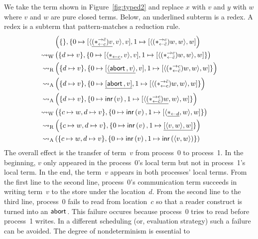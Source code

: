 \begin{example}
 We take the term shown in
 Figure~\ref{fig:typed2} and replace $x$ with $v$ and $y$ with $w$ where
 $v$ and $w$ are pure closed terms.
 Below, an underlined subterm is a redex.  A redex is a subterm that
 pattern-matches a reduction rule.
 \begin{align*}
  &\left(\{\}, \{
  0\mapsto[{\langle{\underline{(\ast^{\rightarrow {\bar{c}}}_{\leftarrow{c}})v},v}\rangle,v}],
  1\mapsto[{\langle{           (\ast^{\rightarrow {c}}_{\leftarrow{\bar{c}}})w ,w}\rangle,w}]
  \right)
  \\   \rightsquigarrow_{\mathrm W} &
  \left( \{d\mapsto v\},
  \{
  0\mapsto [{{\langle{\underline{\ast_{\leftarrow{c}}},  v}\rangle}, v}],
  1\mapsto [{           \langle{(\ast^{\rightarrow {c}}_{\leftarrow{\bar{c}}})w,w}\rangle,w}]
  \}
  \right)
  \\ \rightsquigarrow_{\mathrm R} &
  \left( \{d\mapsto v\},
  \{
  0\mapsto [{\underline{\langle{\mathsf{abort\,},  v}\rangle}, v}],
  1\mapsto [{           \langle{(\ast^{\rightarrow {c}}_{\leftarrow{\bar{c}}})w,w}\rangle,w}]
  \}
  \right)
  \\
  \rightsquigarrow_{\mathrm A} &
  \left(
  \{d\mapsto v\},
  \{
  0\mapsto\underline{[{\mathsf{abort\,},v}]},
  1\mapsto{[{\langle{(\ast^{\rightarrow {\bar{c}}}_{\leftarrow{c}})w,w}\rangle,w}]}
  \}
  \right)
  \\
  \rightsquigarrow_{\mathrm A} &
  \left(\{d\mapsto v\},
  \{
  0\mapsto\mathsf{inr}\left({v}\right),
  1\mapsto[{\langle{\underline{(\ast^{\rightarrow {c}}_{\leftarrow{\bar{c}}})w},w}\rangle,w}]
  \}
  \right)
  \\
  \rightsquigarrow_{\mathrm W} &
  \left(
  \{c\mapsto w, d\mapsto v\}
  ,
  \{
  0\mapsto \mathsf{inr}\left({v}\right),
  1\mapsto [{\langle{\underline{\ast_{\leftarrow{d}}}, w}\rangle, w}]
  \}
  \right)
  \\
  \rightsquigarrow_{\mathrm R} &
  \left(
  \{c\mapsto w, d\mapsto v\}
  ,
  \{
  0\mapsto \mathsf{inr}\left({v}\right),
  1\mapsto \underline{[{\langle{v,w}\rangle,w}]}
  \}
  \right)
  \\
  \rightsquigarrow_{\mathrm A} &
  \left(
  \{c\mapsto w, d\mapsto v\}
  ,
  \{
  0\mapsto \mathsf{inr}\left({v}\right),
  1\mapsto \mathsf{inr}\left({\langle{v,w}\rangle}\right)
  \}
  \right)
 \end{align*}
 The overall effect is the transfer of term~$v$ from process~0 to
 process~1.  In the beginning, $v$ only appeared in the process~0's
 local term but not in process~1's local term.  In the end, the
 term~$v$ appears in both processes' local terms.
 From the first line to the second line,
 process~0's communication term succeeds in writing term~$v$ to the
 store under the location~$d$.
 From the second line to the third line, process~0 fails to read from
 location~$c$ so that a reader construct is turned into an $\mathsf{abort\,}$.
 This failure occures because process~0 tries to read before process~1
 writes.  In a different scheduling (or, evaluation strategy) such a
 failure can be avoided.  The degree of nondeterminism is essential to

\end{example}

